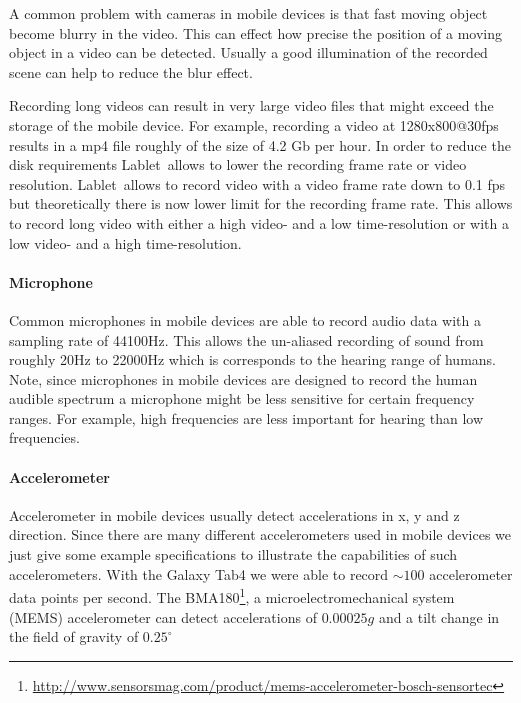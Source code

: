 \documentclass{sigchi}
\newcommand{\lablet}{Lablet\ }
\begin{document}
A common problem with cameras in mobile devices is that fast moving object become blurry in the video.
This can effect how precise the position of a moving object in a video can be detected.
Usually a good illumination of the recorded scene can help to reduce the blur effect.

Recording long videos can result in very large video files that might exceed the storage of the mobile device.
For example, recording a video at 1280x800@30fps results in a mp4 file roughly of the size of 4.2 Gb per hour.
In order to reduce the disk requirements \lablet allows to lower the recording frame rate or video resolution.
\lablet allows to record video with a video frame rate down to 0.1 fps but theoretically there is now lower limit for the recording frame rate.
This allows to record long video with either a high video- and a low time-resolution or with a low video- and a high time-resolution.

\paragraph{Microphone}
Common microphones in mobile devices are able to record audio data with a sampling rate of 44100Hz.
This allows the un-aliased recording of sound from roughly 20Hz to 22000Hz which is corresponds to the hearing range of humans.
Note, since microphones in mobile devices are designed to record the human audible spectrum a microphone might be less sensitive for certain frequency ranges.
For example, high frequencies are less important for hearing than low frequencies.

\paragraph{Accelerometer}
Accelerometer in mobile devices usually detect accelerations in x, y and z direction.
Since there are many different accelerometers used in mobile devices we just give some example specifications to illustrate the capabilities of such accelerometers.
With the Galaxy Tab4 we were able to record $\sim100$ accelerometer data points per second.
The BMA180\footnote{\url{http://www.sensorsmag.com/product/mems-accelerometer-bosch-sensortec}}, a microelectromechanical system (MEMS) accelerometer can detect accelerations of $0.00025g$ and a tilt change in the field of gravity of $0.25^{\circ}$

\end{document}
